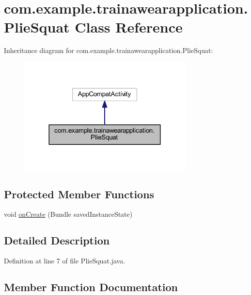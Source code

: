 \hypertarget{classcom_1_1example_1_1trainawearapplication_1_1_plie_squat}{}\section{com.\+example.\+trainawearapplication.\+Plie\+Squat Class Reference}
\label{classcom_1_1example_1_1trainawearapplication_1_1_plie_squat}


Inheritance diagram for com.\+example.\+trainawearapplication.\+Plie\+Squat\+:
\nopagebreak
\begin{figure}[H]
\begin{center}
\leavevmode
\includegraphics[width=252pt]{classcom_1_1example_1_1trainawearapplication_1_1_plie_squat__inherit__graph}
\end{center}
\end{figure}
\subsection*{Protected Member Functions}
\begin{DoxyCompactItemize}
\item 
void \mbox{\hyperlink{classcom_1_1example_1_1trainawearapplication_1_1_plie_squat_a3125f76f7d64ff641f8f07e2b8d5c3a7}{on\+Create}} (Bundle saved\+Instance\+State)
\end{DoxyCompactItemize}


\subsection{Detailed Description}


Definition at line 7 of file Plie\+Squat.\+java.



\subsection{Member Function Documentation}
\mbox{\label{classcom_1_1example_1_1trainawearapplication_1_1_plie_squat_a3125f76f7d64ff641f8f07e2b8d5c3a7}} 
